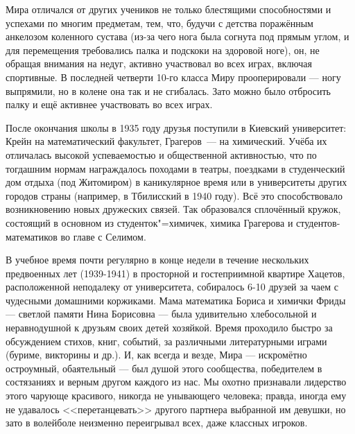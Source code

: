 Мира отличался от других учеников не только блестящими способностями и успехами по многим предметам, тем, что, будучи с детства поражённым анкелозом коленного сустава (из-за чего нога была согнута под прямым углом, и для перемещения требовались палка и подскоки на здоровой ноге), он, не обращая внимания на недуг, активно участвовал во всех играх, включая спортивные. В последней четверти 10-го класса Миру прооперировали --- ногу выпрямили, но в колене она так и не сгибалась. Зато можно было отбросить палку и ещё активнее участвовать во всех играх.

После окончания школы в 1935 году друзья поступили в Киевский университет:
Крейн на математический факультет, Грагеров~--- на химический.
Учёба их отличалась высокой успеваемостью и общественной активностью,
что по тогдашним нормам награждалось походами в театры, поездками в студенческий дом отдыха (под Житомиром)
в каникулярное время или в университеты других городов страны (например, в Тбилисский в 1940 году).
Всё это способствовало возникновению новых дружеских связей.
Так образовался сплочённый кружок, состоящий в основном из сту\-де\-н\-ток"=хи\-ми\-чек,
химика Грагерова и студентов-математиков во главе с Селимом.

В учебное время почти регулярно в конце недели в течение нескольких предвоенных лет (1939-1941) в просторной и гостеприимной квартире Хацетов, расположенной неподалеку от университета, собиралось 6-10 друзей за чаем с чудесными домашними коржиками. Мама математика Бориса и химички Фриды --- светлой памяти Нина Борисовна --- была удивительно хлебосольной и неравнодушной к друзьям своих детей хозяйкой. Время проходило быстро за обсуждением стихов, книг, событий, за различными литературными играми (буриме, викторины и др.). И, как всегда и везде, Мира --- искромётно остроумный, обаятельный --- был душой этого сообщества, победителем в состязаниях и верным другом каждого из нас. Мы охотно признавали лидерство этого чарующе красивого, никогда не унывающего человека; правда, иногда ему не удавалось <<перетанцевать>> другого партнера выбранной им девушки, но зато в волейболе неизменно переигрывал всех, даже классных игроков.

